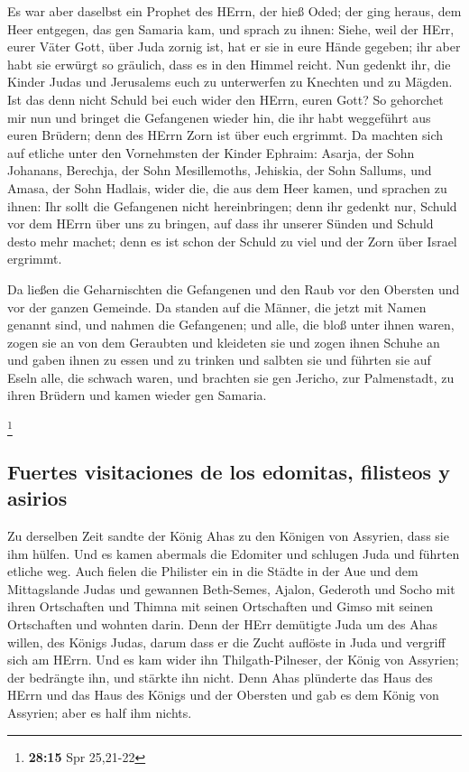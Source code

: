  Es war aber daselbst ein Prophet des HErrn, der hieß
Oded; der ging heraus, dem Heer entgegen, das gen Samaria kam, und
sprach zu ihnen: Siehe, weil der HErr, eurer Väter Gott, über Juda
zornig ist, hat er sie in eure Hände gegeben; ihr aber habt sie erwürgt
so gräulich, dass es in den Himmel reicht.  Nun gedenkt
ihr, die Kinder Judas und Jerusalems euch zu unterwerfen zu Knechten und
zu Mägden. Ist das denn nicht Schuld bei euch wider den HErrn, euren
Gott?  So gehorchet mir nun und bringet die Gefangenen
wieder hin, die ihr habt weggeführt aus euren Brüdern; denn des HErrn
Zorn ist über euch ergrimmt.  Da machten sich auf etliche
unter den Vornehmsten der Kinder Ephraim: Asarja, der Sohn Johanans,
Berechja, der Sohn Mesillemoths, Jehiskia, der Sohn Sallums, und Amasa,
der Sohn Hadlais, wider die, die aus dem Heer kamen,  und
sprachen zu ihnen: Ihr sollt die Gefangenen nicht hereinbringen; denn
ihr gedenkt nur, Schuld vor dem HErrn über uns zu bringen, auf dass ihr
unserer Sünden und Schuld desto mehr machet; denn es ist schon der
Schuld zu viel und der Zorn über Israel ergrimmt.

 Da ließen die Geharnischten die Gefangenen und den Raub
vor den Obersten und vor der ganzen Gemeinde.  Da standen
auf die Männer, die jetzt mit Namen genannt sind, und nahmen die
Gefangenen; und alle, die bloß unter ihnen waren, zogen sie an von dem
Geraubten und kleideten sie und zogen ihnen Schuhe an und gaben ihnen zu
essen und zu trinken und salbten sie und führten sie auf Eseln alle, die
schwach waren, und brachten sie gen Jericho, zur Palmenstadt, zu ihren
Brüdern und kamen wieder gen Samaria.

\footnote{\textbf{28:15} Spr 25,21-22}

\hypertarget{fuertes-visitaciones-de-los-edomitas-filisteos-y-asirios}{%
\subsection{Fuertes visitaciones de los edomitas, filisteos y
asirios}\label{fuertes-visitaciones-de-los-edomitas-filisteos-y-asirios}}

 Zu derselben Zeit sandte der König Ahas zu den Königen
von Assyrien, dass sie ihm hülfen.  Und es kamen abermals
die Edomiter und schlugen Juda und führten etliche weg. 
Auch fielen die Philister ein in die Städte in der Aue und dem
Mittagslande Judas und gewannen Beth-Semes, Ajalon, Gederoth und Socho
mit ihren Ortschaften und Thimna mit seinen Ortschaften und Gimso mit
seinen Ortschaften und wohnten darin.  Denn der HErr
demütigte Juda um des Ahas willen, des Königs Judas, darum dass er die
Zucht auflöste in Juda und vergriff sich am HErrn.  Und
es kam wider ihn Thilgath-Pilneser, der König von Assyrien; der
bedrängte ihn, und stärkte ihn nicht.  Denn Ahas
plünderte das Haus des HErrn und das Haus des Königs und der Obersten
und gab es dem König von Assyrien; aber es half ihm nichts.

